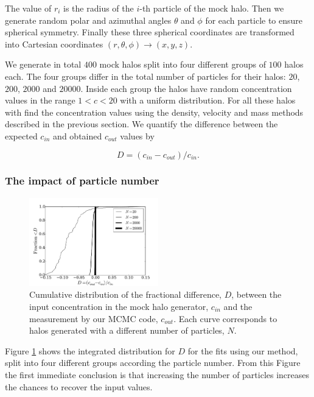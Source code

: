\documentclass{emulateapj}
\begin{document}
The value of $r_i$ is the radius of the $i$-th particle of the mock
halo.
Then we generate random polar and azimuthal angles $\theta$ and $\phi$
for each particle to ensure spherical symmetry.
Finally these three spherical coordinates are transformed into Cartesian coordinates
$(r,\theta,\phi) \rightarrow (x,y,z)$.



We generate in total $400$ mock halos split into four different
groups of $100$ halos each.
The four groups differ in the total number of particles for their halos:
$20$, $200$, $2000$ and $20000$.
Inside each group the halos have random concentration values in
the range $1<c<20$ with a uniform distribution.
For all these halos with find the concentration values using the
density, velocity and mass methods described in the previous
section. We quantify the difference between the expected $c_{in}$
and obtained $c_{out}$ values by

\begin{equation}
D=(c_{in}-c_{out})/c_{in}.
\label{eq:D}
\end{equation}

\subsubsection{The impact of particle number}

\begin{figure}
\begin{center}
  \includegraphics[width=0.50\textwidth]{mock_percentual_diff.pdf}
\end{center}
\caption{Cumulative distribution of the fractional difference, $D$, between
  the input concentration in the mock halo generator, $c_{in}$ and the
  measurement by our MCMC code, $c_{out}$. Each curve corresponds to
  halos generated with a different number of particles, $N$.
    \label{fig:results_mocks}}
\end{figure}

Figure \ref{fig:results_mocks} shows the integrated distribution for
$D$ for the fits using our method, split into four different groups
according the particle number.
From this Figure the first immediate
conclusion is that increasing the number of particles increases the
chances to recover the input values.
\end{document}
